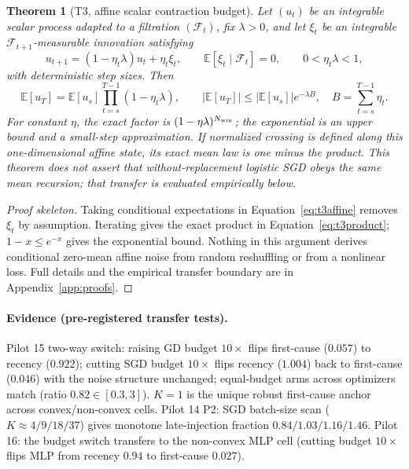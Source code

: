 \documentclass{article}
\newtheorem{theorem}{Theorem}
\newcommand{\B}{B}            %
\begin{document}
\begin{theorem}[T3, affine scalar contraction budget]
\label{thm:t3}
Let $(u_t)$ be an integrable scalar process adapted to a filtration $(\mathcal F_t)$, fix
$\lambda>0$, and let $\xi_t$ be an integrable $\mathcal F_{t+1}$-measurable innovation satisfying
\begin{equation}
u_{t+1}=(1-\eta_t\lambda)u_t+\eta_t\xi_t,
\qquad \mathbb E[\xi_t\mid\mathcal F_t]=0,
\qquad 0<\eta_t\lambda<1,
\label{eq:t3affine}
\end{equation}
with deterministic step sizes. Then
\begin{equation}
\mathbb E[u_T]=\mathbb E[u_s]\prod_{t=s}^{T-1}(1-\eta_t\lambda),
\qquad
|\mathbb E[u_T]|\leq |\mathbb E[u_s]|e^{-\lambda\B},
\quad \B=\sum_{t=s}^{T-1}\eta_t.
\label{eq:t3product}
\end{equation}
For constant $\eta$, the exact factor is $(1-\eta\lambda)^{N_{\rm win}}$; the exponential is
an upper bound and a small-step approximation. If normalized crossing is defined along this
one-dimensional affine state, its exact mean law is one minus the product. This theorem does
not assert that without-replacement logistic SGD obeys the same mean recursion; that transfer
is evaluated empirically below.
\end{theorem}

\begin{proof}[Proof skeleton]
Taking conditional expectations in Equation~\ref{eq:t3affine} removes $\xi_t$ by assumption.
Iterating gives the exact product in Equation~\ref{eq:t3product};
$1-x\leq e^{-x}$ gives the exponential bound. Nothing in this argument derives conditional
zero-mean affine noise from random reshuffling or from a nonlinear loss. Full details and the
empirical transfer boundary are in Appendix~\ref{app:proofs}.
\end{proof}

\paragraph{Evidence (pre-registered transfer tests).} Pilot 15 two-way switch: raising GD budget
$10\times$ flips first-cause ($0.057$) to recency ($0.922$); cutting SGD budget $10\times$ flips
recency ($1.004$) back to first-cause ($0.046$) with the noise structure unchanged; equal-budget
arms across optimizers match (ratio $0.82\in[0.3,3]$). $K=1$ is the unique robust first-cause
anchor across convex/non-convex cells. Pilot 14 P2: SGD batch-size scan ($K\approx4/9/18/37$)
gives monotone late-injection fraction $0.84/1.03/1.16/1.46$. Pilot 16: the budget switch
transfers to the non-convex MLP cell (cutting budget $10\times$ flips MLP from recency $0.94$ to
first-cause $0.027$).
\end{document}
